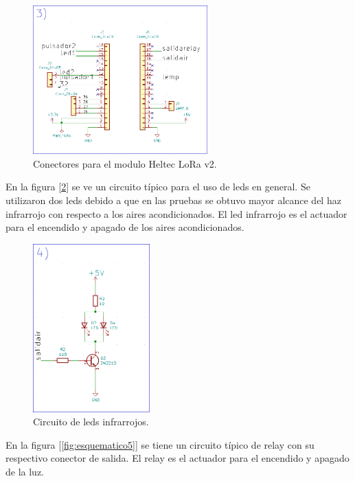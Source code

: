 \begin{figure}[h!]
	\centering
	\includegraphics[width=0.6\textwidth]{./Figures/esquematico3.png}
	\caption{Conectores para el modulo Heltec LoRa v2.}
	\label{fig:esquematico3}
\end{figure}

En la figura [\ref{fig:esquematico4}] se ve un circuito típico para el uso de leds en general. Se utilizaron dos leds debido a que en las pruebas se obtuvo mayor alcance del haz infrarrojo con respecto a los aires acondicionados. El led infrarrojo es el actuador para el encendido y apagado de los aires acondicionados.

\begin{figure}[h!]
	\centering
	\includegraphics[width=0.4\textwidth]{./Figures/esquematico4.png}
	\caption{Circuito de leds infrarrojos.}
	\label{fig:esquematico4}
\end{figure}

En la figura [\ref{fig:esquematico5}] se tiene un circuito típico de relay con su respectivo conector de salida. El relay es el actuador para el encendido y apagado de la luz.


